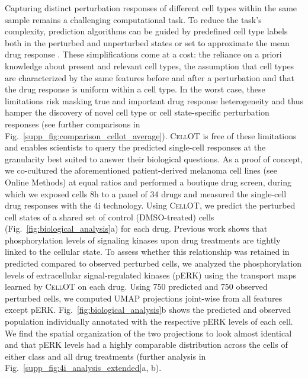  Capturing distinct perturbation responses of different cell types within the same sample remains a challenging computational task. To reduce the task's complexity, prediction algorithms can be guided by predefined cell type labels both in the perturbed and unperturbed states \citep{chen2020dissecting} or set to approximate the mean drug response \citep{lotfollahi2019scgen}.  These simplifications come at a cost: the reliance on a priori knowledge about present and relevant cell types, the assumption that cell types are characterized by the same features before and after a perturbation and that the drug response is uniform within a cell type.
In the worst case, these limitations risk masking true and important drug response heterogeneity  and thus hamper the discovery of novel cell type or cell state-specific perturbation responses (see further comparisons in Fig.~\ref{supp_fig:comparison_cellot_average}).
\textsc{CellOT} is free of these limitations and enables scientists to query the predicted single-cell responses at the granularity best suited to answer their biological questions. As a proof of concept, we co-cultured the aforementioned patient-derived melanoma cell lines (see Online Methods) at equal ratios and performed a boutique drug screen, during which we exposed cells 8h to a panel of 34 drugs and measured the single-cell drug responses with the 4i technology. 
Using \textsc{CellOT}, 
we predict the perturbed cell states of a shared set of control (DMSO-treated) cells (Fig.~\ref{fig:biological_analysis}a) for each drug.
Previous work \citep{kramer2019cellular} shows that phosphorylation levels of signaling kinases upon drug treatments are tightly linked to the cellular state. 
To assess whether this relationship was retained in predicted compared to observed perturbed cells, we analyzed the phosphorylation levels of extracellular signal-regulated kinases (pERK) using the transport maps learned by \textsc{CellOT} on each drug.
Using 750 predicted and 750 observed perturbed cells, we computed UMAP projections joint-wise from all features except pERK. Fig.~\ref{fig:biological_analysis}b shows the predicted and observed population individually annotated with the respective pERK levels of each cell. We find the spatial organization of the two projections to look almost identical and that pERK levels had a highly comparable distribution across the cells of either class and all drug treatments (further analysis in Fig.~\ref{supp_fig:4i_analysis_extended}a, b).

